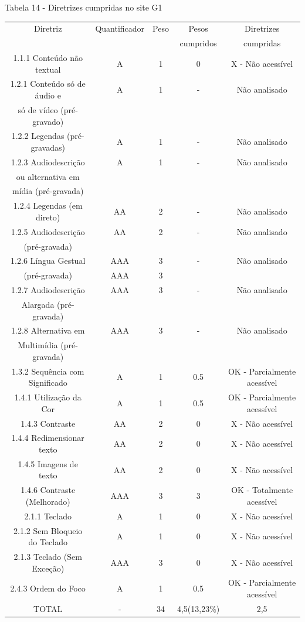 \documentclass[a4paper]{article}
\begin{document}
\begin{titlepage}
Tabela 14 - Diretrizes cumpridas no site G1\\[-1cm]
\begin{center}
	\fontsize{8pt}{8pt}\selectfont	
	\begin{longtable}{|c|c|c|c|c|}
		\hline
		Diretriz & Quantificador & Peso & Pesos & Diretrizes\\
		& & & cumpridos & cumpridas\\
		\hline
		1.1.1 Conteúdo não textual & A & 1 & 0 & X - Não acessível \\
		\hline
		1.2.1 Conteúdo só de áudio e & A & 1 & - & Não analisado \\
		só de vídeo (pré-gravado) & & & & \\
		\hline
		1.2.2 Legendas (pré-gravadas) & A & 1 & - & Não analisado \\
		\hline
		1.2.3 Audiodescrição & A & 1 & - & Não analisado \\
		ou alternativa em & & & & \\
		mídia (pré-gravada) & & & & \\
		\hline
		1.2.4 Legendas (em direto) & AA & 2 & - & Não analisado \\
		\hline
		1.2.5 Audiodescrição & AA & 2 & - & Não analisado \\
		(pré-gravada) & & & & \\
		\hline
		1.2.6 Língua Gestual & AAA & 3 & - & Não analisado \\
		(pré-gravada) & AAA & 3 & & \\
		\hline
		1.2.7 Audiodescrição & AAA & 3 & - & Não analisado \\
		Alargada (pré-gravada) & & & & \\
		\hline
		1.2.8 Alternativa em & AAA & 3 & - & Não analisado \\
		Multimídia (pré-gravada) & & & & \\
		\hline
		1.3.2 Sequência com Significado & A & 1 & 0.5 & OK - Parcialmente acessível \\
		\hline
		1.4.1 Utilização da Cor & A & 1 & 0.5 & OK - Parcialmente acessível \\
		\hline
		1.4.3 Contraste & AA & 2 & 0 & X - Não acessível \\
		\hline
		1.4.4 Redimensionar texto & AA & 2 & 0 & X - Não acessível \\
		\hline
		1.4.5 Imagens de texto & AA & 2 & 0 & X - Não acessível \\
		\hline
		1.4.6 Contraste (Melhorado) & AAA & 3 & 3 & OK - Totalmente acessível \\
		\hline
		2.1.1 Teclado & A & 1 & 0 & X - Não acessível \\
		\hline
		2.1.2 Sem Bloqueio do Teclado & A & 1 & 0 & X - Não acessível \\
		\hline
		2.1.3 Teclado (Sem Exceção) & AAA & 3 & 0 & X - Não acessível \\
		\hline
		2.4.3 Ordem do Foco & A & 1 & 0.5 & OK - Parcialmente acessível \\
		\hline
		TOTAL & - & 34 & 4,5(13,23\%) & 2,5 \\
		\hline
	\end{longtable}
\end{center}


\end{titlepage}
\end{document}
